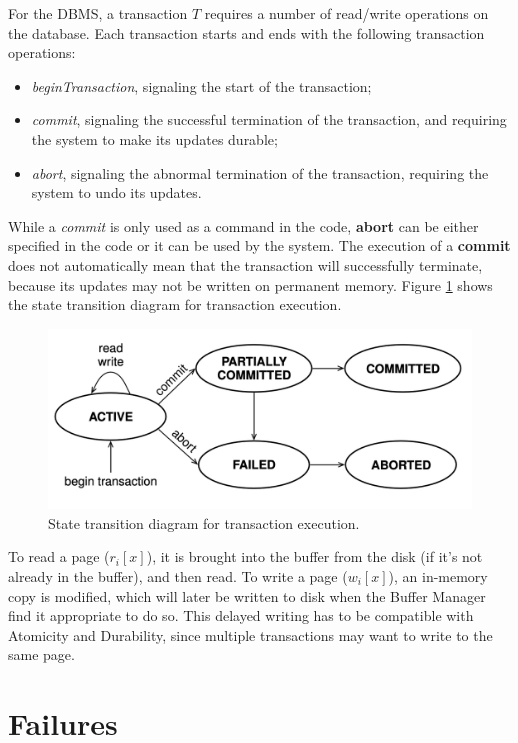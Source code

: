 For the DBMS, a transaction $T$ requires a number of read/write operations on the database. Each transaction starts and ends with the following transaction operations:
\begin{itemize}
    \item \textit{beginTransaction}, signaling the start of the transaction;
    \item \textit{commit}, signaling the successful termination of the transaction, and requiring the system to make its updates durable;
    \item \textit{abort}, signaling the abnormal termination of the transaction, requiring the system to undo its updates.
\end{itemize}
While a \textit{commit} is only used as a command in the code, \textbf{abort} can be either specified in the code or it can be used by the system. The execution of a \textbf{commit} does not automatically mean that the transaction will successfully terminate, because its updates may not be written on permanent memory. Figure \ref{fig:transaction-states} shows the state transition diagram for transaction execution.
\begin{figure}[h]
    \centering
    \includegraphics[width=0.5\linewidth]{img/transaction_states.png}
    \caption{State transition diagram for transaction execution.}
    \label{fig:transaction-states}
\end{figure}
To read a page ($r_i[x]$), it is brought into the buffer from the disk (if it's not already in the buffer), and then read. To write a page ($w_i[x]$), an in-memory copy is modified, which will later be written to disk when the Buffer Manager find it appropriate to do so. This delayed writing has to be compatible with Atomicity and Durability, since multiple transactions may want to write to the same page.

\section{Failures}

